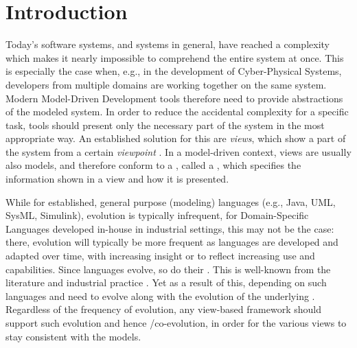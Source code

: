 \section{Introduction}
\label{sec:Introduction}

Today's software systems, and systems in general, have reached a complexity which
makes it nearly impossible to comprehend the entire system at once.
This is especially the case when, e.g., in the development of Cyber-Physical Systems,
developers from multiple domains are working together on the same system.
Modern Model-Driven Development tools therefore need to provide abstractions of the modeled system.
In order to reduce the accidental complexity for a specific task, tools should present only the necessary part of the system in the most appropriate way.
An established solution for this are \emph{views}, which show a part of the system from a certain \emph{viewpoint} \autocite{atkinson_orthographic_2010}.
In a model-driven context, views are usually also models, and therefore conform to a \metamodel,
called a \emph{\viewtype} \autocite{goldschmidt_towards_2012}, which specifies 
the information shown in a view and how it is presented.

While for established, general purpose (modeling) languages (e.g., Java, UML, SysML, Simulink), evolution is typically infrequent, for Domain-Specific Languages developed in-house in industrial settings, this may not be the case: there, evolution will typically be more frequent as languages are developed and adapted over time, with increasing insight or to reflect increasing use and capabilities.
Since languages evolve, so do their \metamodels. This is well-known from the literature and industrial practice \cite{durisic_evolution_2014}. Yet as a result of this, \viewtypes depending on such languages and \metamodels need to evolve along with the evolution of the underlying \metamodels. Regardless of the frequency of \metamodel evolution, any view-based framework should support such evolution and hence \metamodel/\viewtype co-evolution, in order for the various views to stay consistent with the models. 

